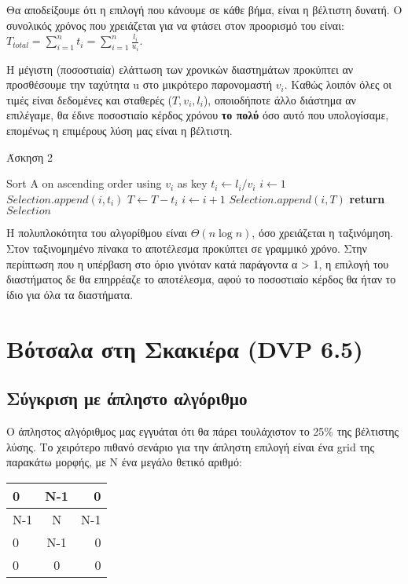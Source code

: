 \documentclass[a4paper,11pt]{article}
\begin{document}
Θα αποδείξουμε ότι η επιλογή που κάνουμε σε κάθε βήμα, είναι η βέλτιστη
δυνατή.
Ο συνολικός χρόνος που χρειάζεται για να φτάσει στον προορισμό του είναι: \\
$T_{total}=\displaystyle\sum\limits_{i=1}^n{t_i} =
\displaystyle\sum\limits_{i=1}^n{\frac{l_i}{u_i}}$.

Η μέγιστη (ποσοστιαία) ελάττωση των χρονικών διαστημάτων προκύπτει αν
προσθέσουμε την ταχύτητα u στο μικρότερο παρονομαστή $v_i$. Kαθώς λοιπόν
όλες οι τιμές είναι δεδομένες και σταθερές ($T, v_i, l_i$), οποιοδήποτε άλλο
διάστημα αν επιλέγαμε, θα έδινε ποσοστιαίο κέρδος χρόνου \textbf{το πολύ} όσο αυτό
που υπολογίσαμε, επομένως η επιμέρους λύση μας είναι η βέλτιστη.\\

\begin{algorithm}[H]
\caption{Άσκηση 2}
\begin{algorithmic}[1]
    \State Sort A on ascending order using $v_i$ as key
	\State $t_i \gets l_i / v_i$
    \EndFor
{}
    \State $i \gets 1$
	\State $Selection.append (i,t_i)$
	\State $T \gets T - t_i$
        \State $i \gets i+1$
    \EndWhile
    \State $Selection.append (i, T)$
    \State \textbf{return} $Selection$
\EndProcedure
\end{algorithmic}
\end{algorithm}

Η πολυπλοκότητα του αλγορίθμου είναι $\Theta(n\log{n})$, όσο χρειάζεται η
ταξινόμηση. Στον ταξινομημένο πίνακα το αποτέλεσμα προκύπτει σε γραμμικό
χρόνο.
Στην περίπτωση που η υπέρβαση στο όριο γινόταν κατά παράγοντα α > 1, η επιλογή
του διαστήματος δε θα επηρρέαζε το αποτέλεσμα, αφού το ποσοστιαίο κέρδος θα
ήταν το ίδιο για όλα τα διαστήματα.



\section{Βότσαλα στη Σκακιέρα (DVP 6.5)}
\subsection{Σύγκριση με άπληστο αλγόριθμο}
Ο άπληστος αλγόριθμος μας εγγυάται ότι θα πάρει τουλάχιστον το 25\% της
βέλτιστης λύσης. Το χειρότερο πιθανό σενάριο για την άπληστη επιλογή είναι ένα
grid της παρακάτω μορφής, με N ένα μεγάλο θετικό αριθμό:
\begin{center}
    \begin{tabular}{| l | c | r | }
    \hline
    0 & Ν-1 & 0 \\ \hline
    Ν-1 & Ν & Ν-1 \\ \hline
    0 & Ν-1 & 0 \\ \hline
    0 & 0 & 0 \\
    \hline
    \end{tabular}
\end{center}
\end{document}
